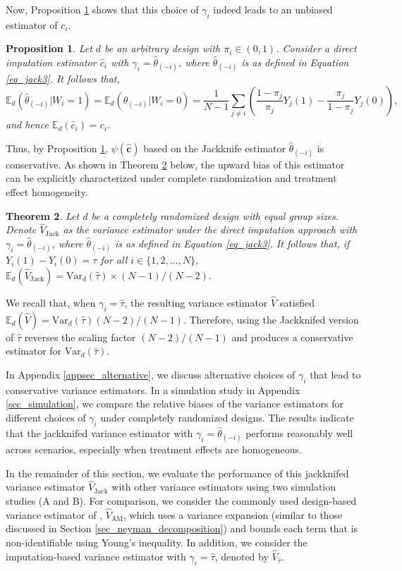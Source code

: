 \documentclass[12pt]{article}
\newcommand{\Var}{{\text{Var}}}
\newcommand{\E}{{\mathbb{E}}}
\newtheorem{theorem}{Theorem}[section]
\newtheorem{proposition}[theorem]{Proposition}
\begin{document}
Now, Proposition \ref{prop_jack_general2} shows that this choice of $\gamma_i$ indeed leads to an unbiased estimator of $c_i$.
\begin{proposition}\normalfont
Let $d$ be an arbitrary design with $\pi_i \in (0,1)$. Consider a direct imputation estimator $\hat{c}_i$ with $\gamma_i = \hat{\theta}_{(-i)}$, where $\hat{\theta}_{(-i)}$ is as defined in Equation \ref{eq_jack3}. It follows that,
$$\E_d(\hat{\theta}_{(-i)}|W_i = 1) = \E_d(\hat{\theta}_{(-i)}|W_i = 0) = \frac{1}{N-1}\sum_{j \neq i}\left(\frac{1-\pi_j}{\pi_j}Y_j(1) - \frac{\pi_j}{1-\pi_j}Y_j(0)\right),$$
and hence $\E_d(\hat{c}_i) = c_i.$
    \label{prop_jack_general2}    
\end{proposition}
Thus, by Proposition \ref{prop_jack_general2}, $\psi(\hat{\bm{c}})$ based on the Jackknife estimator $\hat{\theta}_{(-i)}$ is conservative. As shown in Theorem \ref{thm_jack2_bias} below, the upward bias of this estimator can be explicitly characterized under complete randomization and treatment effect homogeneity. 
\begin{theorem} \normalfont
Let $d$ be a completely randomized design with equal group sizes. Denote $\hat{V}_{\text{Jack}}$ as the variance estimator under the direct imputation approach with $\gamma_i = \hat{\theta}_{(-i)}$, where $\hat{\theta}_{(-i)}$ is as defined in Equation \ref{eq_jack3}. It follows that, if $Y_i(1) - Y_i(0) = \tau$ for all $i \in \{1,2,...,N\}$, $\E_d(\hat{V}_{\text{Jack}}) = \Var_d(\hat{\tau}) \times (N-1)/(N-2).$
\label{thm_jack2_bias}
\end{theorem}
We recall that, when $\gamma_i = \hat{\tau}$, the resulting variance estimator $\hat{V}$ satisfied $\E_d(\hat{V}) = \Var_d(\hat{\tau}){(N-2)}/{(N-1)}$. Therefore, using the Jackknifed version of $\hat{\tau}$ reverses the scaling factor $(N-2)/(N-1)$ and produces a conservative estimator for $\Var_d(\hat{\tau})$. 

In Appendix \ref{appsec_alternative}, we discuss alternative choices of $\gamma_i$ that lead to conservative variance estimators. In a simulation study in Appendix \ref{sec_simulation}, we compare the relative biases of the variance estimators for different choices of $\gamma_i$ under completely randomized designs. The results indicate that the jackknifed variance estimator with $\gamma_i = \hat{\theta}_{(-i)}$ performs reasonably well across scenarios, especially when treatment effects are homogeneous.

In the remainder of this section, we evaluate the performance of this jackknifed variance estimator $\hat{V}_{\text{Jack}}$ with other variance estimators using two simulation studies (A and B). For comparison, we consider the commonly used design-based variance estimator of \cite{aronow2013class}, $\hat{V}_{\text{AM}}$, which uses a variance expansion (similar to those discussed in Section \ref{sec_neyman_decomposition}) and bounds each term that is non-identifiable using Young's inequality. In addition, we consider the imputation-based variance estimator with $\gamma_i = \hat{\tau}$, denoted by $\hat{V}_{\hat{\tau}}$. 
\end{document}
